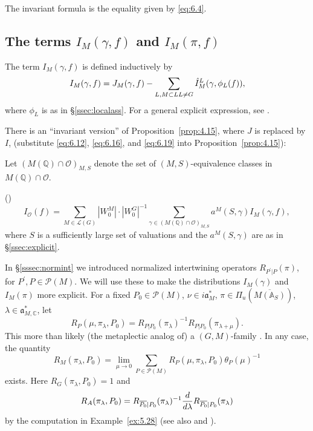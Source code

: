 The invariant formula is the equality given by \eqref{eq:6.4}.

\subsection{The terms $I_M(\gamma, f)$ and $I_M(\pi,f)$}

The term $I_M(\gamma,f)$ is defined inductively by
\begin{equation}\label{eq:6.19}
I_M(\gamma,f)
=J_M(\gamma,f)-
\sum_{ L, M\subset L\\ L\not= G}
\hat{I}_M^L(\gamma,\phi_L(f)),
\end{equation}
where $\phi_L$ is as in \S\ref{ssec:localass}.
For a general explicit expression, see \cite{A16}.

There is an ``invariant version'' of Proposition~\ref{prop:4.15}, where $J$ is
replaced by $I$, (substitute \eqref{eq:6.12},
\eqref{eq:6.16}, and \eqref{eq:6.19} into Proposition~\ref{prop:4.15}):

Let $(M({\mathbb{Q}})\cap {\mathcal{O}})_{M,S}$ denote the set of
$(M,S)$-equivalence classes in $M({\mathbb {Q}})\cap {\mathcal{O}}$.

\begin{proposition}\label{prop:6.17}
(\cite[Theorem 3.3]{A10}) 
\[
I_{{\mathcal{O}}}(f)
=\sum_{M\in {\mathcal{L}}(G)}|W_0^M|\cdot |W_0^G|^{-1}
\sum_{\gamma \in (M({\mathbb{Q}})\cap {\mathcal{O}})_{M,S}}
a^M(S,\gamma )I_M(\gamma ,f),
\]
where $S$ is a sufficiently large set of valuations and the
$a^M(S,\gamma)$ are as in \S\ref{ssec:explicit}.
\end{proposition}

In \S\ref{sssec:normint} we introduced normalized intertwining operators
$R_{P^{\prime}|P}(\pi)$, for $P^{\prime},P\in {\mathcal P}(M)$.
We will use these to make the distributions
$I_M(\gamma)$ and $I_M(\pi)$ more explicit.
For a fixed $P_0\in {\mathcal P}(M)$,
$\nu\in i{\mathfrak{a}}_M^*$,
$\pi\in \Pi_u(\overline{M({\mathbb{A}}_S)})$,
$\lambda\in {\mathfrak{a}}_{M,{\mathbb{C}}}^*$, let
\begin{equation}\label{eq:6.20}
R_P(\mu,\pi_\lambda,P_0)
=R_{P|P_0}(\pi_\lambda)^{-1}R_{P|P_0}(\pi_{\lambda+\mu}) .
\end{equation}
This more than likely (the metaplectic analog of) a
$(G,M)$-family \cite[section 6]{A11}. In any case, the quantity
\[
R_M(\pi_\lambda,P_0)
=\lim_{\mu\rightarrow 0}
\sum_{P\in {\mathcal P}(M)}
R_P(\mu,\pi_\lambda,P_0)\theta_P(\mu)^{-1}
\]
exists. Here $R_G(\pi_\lambda,P_0)=1$ and
\[
R_A(\pi_\lambda,P_0)=
R_{\overline{P_0}|P_0}(\pi_\lambda)^{-1}
{d\over d\lambda}
R_{\overline{P_0}|P_0}(\pi_\lambda)
\]
by the computation in Example~\ref{ex:5.28} (see also \cite{A11} and \cite[(6.5)]{A6}).

